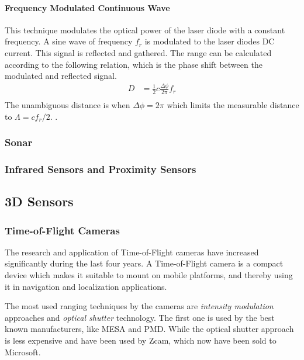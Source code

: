 \paragraph{Frequency Modulated Continuous Wave}
This technique modulates the optical power of the laser diode with a constant frequency.
A sine wave of frequency $f_{r}$ is modulated to the laser diodes DC current. This signal
is reflected and gathered. The range can be calculated according to the following
relation, which is the phase shift between the modulated and reflected signal.
\begin{equation}
    \begin{aligned}
        D &= \frac{1}{2} c\frac{\Delta \phi}{2 \pi} f_{r} \\
    \end{aligned}
\end{equation}
The unambiguous distance is when $\Delta \phi = 2 \pi$ which limits the measurable
distance to $\Lambda = c f_r /2$. \cite{laser-ranging-critical-review}.



\subsubsection{Sonar}


\subsubsection{Infrared Sensors and Proximity Sensors}


\subsection{3D Sensors}


\subsubsection{Time-of-Flight Cameras}
The research and application of Time-of-Flight cameras have increased significantly during the last four
years. A Time-of-Flight camera is a compact device which makes it suitable to mount on
mobile platforms, and thereby using it in navigation and localization applications. 

The most used ranging techniques by the cameras are \emph{intensity modulation} approaches and
\emph{optical shutter} technology. The first one is used by the best known manufacturers,
like MESA and PMD. While the optical shutter approach is less expensive and have been used
by Zcam, which now have been sold to Microsoft. 


